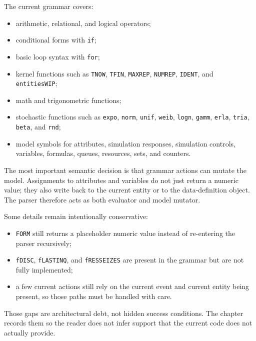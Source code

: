 The current grammar covers:
\begin{itemize}
\item arithmetic, relational, and logical operators;
\item conditional forms with \texttt{if};
\item basic loop syntax with \texttt{for};
\item kernel functions such as \texttt{TNOW}, \texttt{TFIN}, \texttt{MAXREP},
      \texttt{NUMREP}, \texttt{IDENT}, and \texttt{entitiesWIP};
\item math and trigonometric functions;
\item stochastic functions such as \texttt{expo}, \texttt{norm},
      \texttt{unif}, \texttt{weib}, \texttt{logn}, \texttt{gamm},
      \texttt{erla}, \texttt{tria}, \texttt{beta}, and \texttt{rnd};
\item model symbols for attributes, simulation responses, simulation controls,
      variables, formulas, queues, resources, sets, and counters.
\end{itemize}

The most important semantic decision is that grammar actions can mutate the
model. Assignments to attributes and variables do not just return a numeric
value; they also write back to the current entity or to the data-definition
object. The parser therefore acts as both evaluator and model mutator.

Some details remain intentionally conservative:
\begin{itemize}
\item \texttt{FORM} still returns a placeholder numeric value instead of
      re-entering the parser recursively;
\item \texttt{fDISC}, \texttt{fLASTINQ}, and \texttt{fRESSEIZES} are present
      in the grammar but are not fully implemented;
\item a few current actions still rely on the current event and current entity
      being present, so those paths must be handled with care.
\end{itemize}

Those gaps are architectural debt, not hidden success conditions. The chapter
records them so the reader does not infer support that the current code does
not actually provide.

